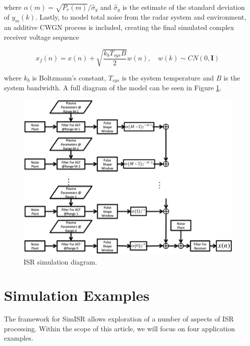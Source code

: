 \noindent where $\alpha(m) = \sqrt{P_r(m)}/\widehat{\sigma}_y$ and $\widehat{\sigma}_y$ is the estimate of the standard deviation of $y_m(k)$. Lastly, to model total noise from the radar system and environment, an additive CWGN process is included, creating the final simulated complex receiver voltage sequence

\begin{equation}
\label{eq:addnoise}
x_f(n) = x(n) +\sqrt{\frac{k_bT_{sys}B}{2}} w(n), \quad w(k)\sim CN(0,\mathbf{I})
\end{equation}

\noindent where $k_b$ is Boltzmann's constant, $T_{sys}$ is the system temperature and $B$ is the system bandwidth.
A full diagram of the model can be seen in Figure \ref{fig:isrdiag}.

\begin{figure}[!h]
\centering
\includegraphics[width=5.5in]{diagram}
\caption{ISR simulation diagram.}
\label{fig:isrdiag}
\end{figure}
\section{Simulation Examples}
\label{sec:simex}

The framework for SimISR allows exploration of a number of aspects of ISR processing. Within the scope of this article, we will focus on four application examples.

